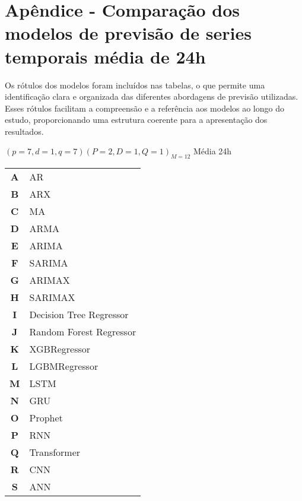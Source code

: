 
\section{Ap\^endice - Compara\c c\~ao dos modelos de previs\~ao de series temporais m\'edia de 24h}\label{sec:comtb24}


Os rótulos dos modelos foram incluídos nas tabelas, o que permite uma identificação clara e organizada das diferentes abordagens de previsão utilizadas. Esses rótulos facilitam a compreensão e a referência aos modelos ao longo do estudo, proporcionando uma estrutura coerente para a apresentação dos resultados.

$(p = 7,d = 1,q = 7) (P = 2,D = 1,Q = 1)_{M = 12}$ Média 24h
 
\begin{table}[H]
	\begin{tabular}{cl}
		\textbf{A} & AR                      \\
		\textbf{B} & ARX                     \\
		\textbf{C} & MA                      \\
		\textbf{D} & ARMA                    \\
		\textbf{E} & ARIMA                   \\
		\textbf{F} & SARIMA                  \\
		\textbf{G} & ARIMAX                  \\
		\textbf{H} & SARIMAX                 \\
		\textbf{I} & Decision Tree Regressor  \\
		\textbf{J} & Random Forest Regressor \\
		\textbf{K} & XGBRegressor            \\
		\textbf{L} & LGBMRegressor           \\
		\textbf{M} & LSTM                    \\
		\textbf{N} & GRU                     \\
		\textbf{O} & Prophet                 \\
		\textbf{P} & RNN                     \\
		\textbf{Q} & Transformer            \\
		\textbf{R} & CNN\\
		\textbf{S} & ANN
		
	\end{tabular}
\end{table}



